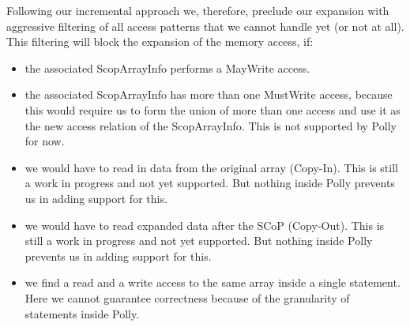 Following our incremental approach we, therefore, preclude our expansion with aggressive filtering of all access patterns that we cannot handle yet (or not at all). This filtering will block the expansion of the memory access, if:
\begin{itemize}
\item the associated ScopArrayInfo performs a MayWrite access.
\item the associated ScopArrayInfo has more than one MustWrite access, because this would require us to form the union of more than one access and use it as the new access relation of the ScopArrayInfo. This is not supported by Polly for now.
\item we would have to read in data from the original array (Copy-In). This is still a work in progress and not yet supported. But nothing inside Polly prevents us in adding support for this.
\item we would have to read expanded data after the SCoP (Copy-Out). This is still a work in progress and not yet supported. But nothing inside Polly prevents us in adding support for this.
\item we find a read and a write access to the same array inside a single statement. Here we cannot guarantee correctness because of the granularity of statements inside Polly.


\end{itemize}
